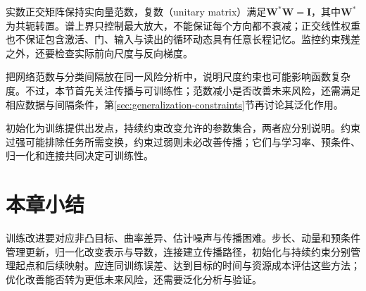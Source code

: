 实数正交矩阵保持实向量范数，复数（unitary matrix）满足$\bm W^*\bm W=\bm I$，其中$\bm W^*$为共轭转置。谱上界只控制最大放大，不能保证每个方向都不衰减；正交线性权重也不保证包含激活、门、输入与读出的循环动态具有任意长程记忆。监控约束残差之外，还要检查实际前向尺度与反向梯度。

把网络范数与分类间隔放在同一风险分析中，说明尺度约束也可能影响函数复杂度。不过，本节首先关注传播与可训练性；范数减小是否改善未来风险，还需满足相应数据与间隔条件，第\ref{sec:generalization-constraints}节再讨论其泛化作用。

初始化为训练提供出发点，持续约束改变允许的参数集合，两者应分别说明。约束过强可能排除任务所需变换，约束过弱则未必改善传播；它们与学习率、预条件、归一化和连接共同决定可训练性。

\section{本章小结}
\label{sec:training-summary}

训练改进要对应非凸目标、曲率差异、估计噪声与传播困难。步长、动量和预条件管理更新，归一化改变表示与导数，连接建立传播路径，初始化与持续约束分别管理起点和后续映射。应连同训练误差、达到目标的时间与资源成本评估这些方法；优化改善能否转为更低未来风险，还需要泛化分析与验证。
